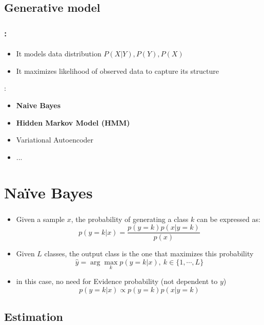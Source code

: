 \documentclass[xcolor=table]{beamer}
\begin{document}
\subsection{Generative model}

\begin{frame}
	\frametitle{\insertshortsubtitle: \insertsection}
	\framesubtitle{\insertsubsection}
	
	\begin{itemize}
		\item It models data distribution $P(X|Y), P(Y), P(X)$
		\item It maximizes likelihood of observed data to capture its structure
	\end{itemize}
	
	\vfill
	:
	\begin{itemize}
		\item \textbf{Naive Bayes}
		\item \textbf{Hidden Markov Model (HMM)}
		\item Variational Autoencoder
		\item...
	\end{itemize}
	
\end{frame}

\section{Naïve Bayes}

\begin{frame}
	\frametitle{\insertshortsubtitle}
	\framesubtitle{\insertsection}
	
	\begin{itemize}
		\item Given a sample $ x $, the probability of generating a class $ k $ can be expressed as:
		\[p(y=k|x) = \frac{p(y=k) p(x|y=k)}{p(x)}\]
		\item Given $ L $ classes, the output class is the one that maximizes this probability
		\[\hat{y} = \arg\max_{k} p(y=k|x),\ k \in \{1, \cdots, L\} \]
		\item in this case, no need for Evidence probability (not dependent to $ y $)
		\[p(y=k|x) \propto p(y=k) p(x|y=k)\]
	\end{itemize}
	
\end{frame}

\subsection{Estimation}
\end{document}
